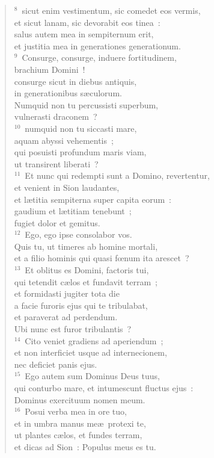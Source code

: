 \begin{flushleft}
\begin{verse}
${}^{8}$~sicut enim vestimentum, sic comedet eos vermis,\\ et sicut lanam, sic devorabit eos tinea~:\\ salus autem mea in sempiternum erit,\\ et justitia mea in generationes generationum.\\
${}^{9}$~Consurge, consurge, induere fortitudinem,\\ brachium Domini~!\\ consurge sicut in diebus antiquis,\\ in generationibus s\ae culorum.\\ Numquid non tu percussisti superbum,\\ vulnerasti draconem~?\\
${}^{10}$~numquid non tu siccasti mare,\\ aquam abyssi vehementis~;\\ qui posuisti profundum maris viam,\\ ut transirent liberati~?\\
${}^{11}$~Et nunc qui redempti sunt a Domino, revertentur,\\ et venient in Sion laudantes,\\ et l\ae titia sempiterna super capita eorum~:\\ gaudium et l\ae titiam tenebunt~;\\ fugiet dolor et gemitus.\\
${}^{12}$~Ego, ego ipse consolabor vos.\\ Quis tu, ut timeres ab homine mortali,\\ et a filio hominis qui quasi fœnum ita arescet~?\\
${}^{13}$~Et oblitus es Domini, factoris tui,\\ qui tetendit c\ae los et fundavit terram~;\\ et formidasti jugiter tota die\\ a facie furoris ejus qui te tribulabat,\\ et paraverat ad perdendum.\\ Ubi nunc est furor tribulantis~?\\
${}^{14}$~Cito veniet gradiens ad aperiendum~;\\ et non interficiet usque ad internecionem,\\ nec deficiet panis ejus.\\
${}^{15}$~Ego autem sum Dominus Deus tuus,\\ qui conturbo mare, et intumescunt fluctus ejus~:\\ Dominus exercituum nomen meum.\\
${}^{16}$~Posui verba mea in ore tuo,\\ et in umbra manus me\ae\ protexi te,\\ ut plantes c\ae los, et fundes terram,\\ et dicas ad Sion~: Populus meus es tu.\end{verse}\end{flushleft}


